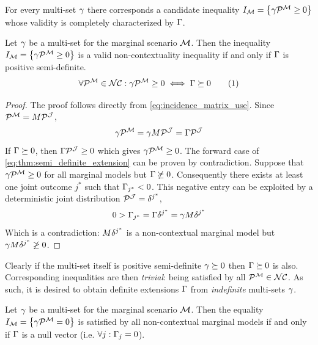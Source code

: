 \documentclass[aps, 10pt, english, twoside, pra, nofootinbib, longbibliography]{revtex4-1}
\begin{document}
    For every multi-set $\gamma$ there corresponds a candidate inequality $I_{\mscenario} = \bc{\ga \tcdot \probvec^{\mscenario} \geq 0}$ whose validity is completely characterized by $\Gamma$.
    \begin{theorem}
        \label{thm:definite_extension_main_thm}
        Let $\gamma$ be a multi-set for the marginal scenario $\mathcal{M}$. Then the inequality $I_{\mscenario} = \bc{\ga \tcdot \probvec^{\mscenario} \geq 0}$ is a valid non-contextuality inequality if and only if $\Gamma$ is positive semi-definite.
        \[ \forall \probvec^{\mscenario} \in \s{NC} : \ga \tcdot \probvec^{\mscenario} \geq 0 \iff \Ga \succeq 0  \eq \label{eq:thm:semi_definite_extension}\]
    \end{theorem}
    \begin{proof}
        The proof follows directly from \cref{eq:incidence_matrix_use}. Since $\probvec^{\mscenario} = M \tcdot \probvec^{\jointvar}$,
        \[ \ga \tcdot \probvec^{\mscenario} = \ga \tcdot M \tcdot \probvec^{\jointvar} = \Ga \tcdot \probvec^{\jointvar} \]
        If $\Gamma \succeq 0$, then $\Ga \tcdot \probvec^{\jointvar} \geq 0$ which gives $\ga \tcdot \probvec^{\mscenario} \geq 0$. The forward case of \cref{eq:thm:semi_definite_extension} can be proven by contradiction. Suppose that $\ga \tcdot \probvec^{\mscenario} \geq 0$ for all marginal models but $\Gamma \not \succeq 0$. Consequently there exists at least one joint outcome $j^{*}$ such that $\Gamma_{j^{*}} < 0$. This negative entry can be exploited by a deterministic joint distribution $\probvec^{\jointvar} = \de^{j^{*}}$,
        \[ 0 > \Gamma_{j^{*}} = \Gamma \delta^{j^{*}} = \gamma  M  \delta^{j^{*}}  \]
        Which is a contradiction: $M  \delta^{j^{*}}$ is a non-contextual marginal model but $\gamma  M  \delta^{j^{*}} \not \geq 0$.
    \end{proof}

    Clearly if the multi-set itself is positive semi-definite $\gamma \succeq 0$ then $\Gamma \succeq 0$ is also. Corresponding inequalities are then \textit{trivial}: being satisfied by all $\probvec^{\mscenario} \in \s{NC}$. As such, it is desired to obtain definite extensions $\Gamma$ from \textit{indefinite} multi-sets $\gamma$.

    \begin{corollary}
        Let $\gamma$ be a multi-set for the marginal scenario $\mathcal{M}$. Then the equality $I_{\mscenario} = \bc{\ga \tcdot \probvec^{\mscenario} = 0}$ is satisfied by all non-contextual marginal models if and only if $\Gamma$ is a null vector (i.e. $\forall j : \Gamma_{j} = 0$).
    \end{corollary}
\end{document}
